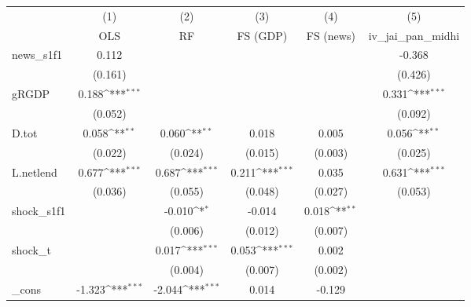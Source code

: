 {
\def\sym#1{\ifmmode^{#1}\else\(^{#1}\)\fi}
\begin{tabular}{l*{5}{c}}
\toprule
            &\multicolumn{1}{c}{(1)}&\multicolumn{1}{c}{(2)}&\multicolumn{1}{c}{(3)}&\multicolumn{1}{c}{(4)}&\multicolumn{1}{c}{(5)}\\
            &\multicolumn{1}{c}{OLS}&\multicolumn{1}{c}{RF}&\multicolumn{1}{c}{FS (GDP)}&\multicolumn{1}{c}{FS (news)}&\multicolumn{1}{c}{iv\_jai\_pan\_midhi}\\
\midrule
news\_s1f1   &       0.112         &                     &                     &                     &      -0.368         \\
            &     (0.161)         &                     &                     &                     &     (0.426)         \\
\addlinespace
gRGDP       &       0.188\sym{***}&                     &                     &                     &       0.331\sym{***}\\
            &     (0.052)         &                     &                     &                     &     (0.092)         \\
\addlinespace
D.tot       &       0.058\sym{**} &       0.060\sym{**} &       0.018         &       0.005         &       0.056\sym{**} \\
            &     (0.022)         &     (0.024)         &     (0.015)         &     (0.003)         &     (0.025)         \\
\addlinespace
L.netlend   &       0.677\sym{***}&       0.687\sym{***}&       0.211\sym{***}&       0.035         &       0.631\sym{***}\\
            &     (0.036)         &     (0.055)         &     (0.048)         &     (0.027)         &     (0.053)         \\
\addlinespace
shock\_s1f1  &                     &      -0.010\sym{*}  &      -0.014         &       0.018\sym{**} &                     \\
            &                     &     (0.006)         &     (0.012)         &     (0.007)         &                     \\
\addlinespace
shock\_t     &                     &       0.017\sym{***}&       0.053\sym{***}&       0.002         &                     \\
            &                     &     (0.004)         &     (0.007)         &     (0.002)         &                     \\
\addlinespace
\_cons      &      -1.323\sym{***}&      -2.044\sym{***}&       0.014         &      -0.129         &                     \\

\end{tabular}}
